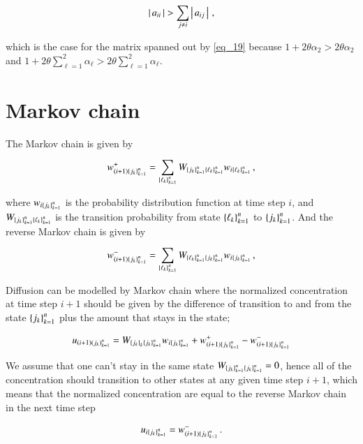 \documentclass[11pt,english,a4paper]{article}
\begin{document}
\begin{flushleft}
\begin{align*}
\left\vert{\,a_{ii}\,}\right\vert > \sum_{j\neq i} \left\vert{\,a_{ij}\,}\right\vert\,,
\end{align*}

which is the case for the matrix spanned out by \eqref{eq_19} because $1+2\theta \alpha_2 > 2\theta \alpha_2$ and $1+2\theta\sum_{\ell=1}^2 \alpha_{\ell} > 2\theta\sum_{\ell=1}^2 \alpha_\ell$.

\section{Markov chain}

The Markov chain is given by

\begin{align}
w_{(i+1)\left\lbrace{j_k}\right\rbrace_{k=1}^n}^+ = \sum_{\left\lbrace{\ell_k}\right\rbrace_{k=1}^n} W_{\left\lbrace{j_k}\right\rbrace_{k=1}^n\left\lbrace{\ell_k}\right\rbrace_{k=1}^n} w_{i\left\lbrace{\ell_k}\right\rbrace_{k=1}^n} \,,
\label{eq_34}
\end{align}

where $w_{i\left\lbrace{j_k}\right\rbrace_{k=1}^n}$ is the probability distribution function  at time step $i$, and $W_{\left\lbrace{j_k}\right\rbrace_{k=1}^n\left\lbrace{\ell_k}\right\rbrace_{k=1}^n}$  is the transition probability from state $\left\lbrace{\ell_k}\right\rbrace_{k=1}^n$ to $\left\lbrace{j_k}\right\rbrace_{k=1}^n$. And the reverse Markov chain is given by

\begin{align}
w_{(i+1)\left\lbrace{j_k}\right\rbrace_{k=1}^n}^- = \sum_{\left\lbrace{\ell_k}\right\rbrace_{k=1}^n} W_{\left\lbrace{\ell_k}\right\rbrace_{k=1}^n\left\lbrace{j_k}\right\rbrace_{k=1}^n} w_{i\left\lbrace{j_k}\right\rbrace_{k=1}^n} \,,
\label{eq_35}
\end{align}

Diffusion can be modelled by Markov chain where the normalized concentration at time step $i+1$ should be given by the difference of transition to and from the state $\left\lbrace{j_k}\right\rbrace_{k=1}^n$ plus the amount that stays in the state; 

\begin{align*}
u_{(i+1)\left({j_k}\right)_{k=1}^n} = W_{\left\lbrace{j_k}\right\rbrace_k\left\lbrace{j_k}\right\rbrace_{k=1}^n} w_{i\left\lbrace{j_k}\right\rbrace_{k=1}^n} +  w_{(i+1)\left\lbrace{j_k}\right\rbrace_{k=1}^n}^+ - w_{(i+1)\left\lbrace{j_k}\right\rbrace_{k=1}^n}^-
\end{align*} 

We assume that one can't stay in the same state $W_{\left\lbrace{j_k}\right\rbrace_{k=1}^n\left\lbrace{j_k}\right\rbrace_{k=1}^n} = 0$, hence all of the concentration should transition to other states at any given time step $i+1$, which means that the normalized concentration are equal to the reverse Markov chain in the next time step

\begin{align*}
u_{i\left\lbrace{j_k}\right\rbrace_{k=1}^n} =  w_{(i+1)\left\lbrace{j_k}\right\rbrace_{k=1}^n}^- \,.
\end{align*}


\end{flushleft}
\end{document}
